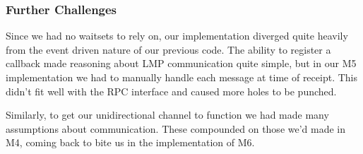 \subsubsection*{Further Challenges} \label{sec:m5_chals}
Since we had no waitsets to rely on, our implementation diverged quite heavily from the event driven nature of our previous code. The ability to register a callback made reasoning about LMP communication quite simple, but in our M5 implementation we had to manually handle each message at time of receipt. This didn't fit well with the RPC interface and caused more holes to be punched.

Similarly, to get our unidirectional channel to function we had made many assumptions about communication. These compounded on those we'd made in M4, coming back to bite us in the implementation of M6. 
